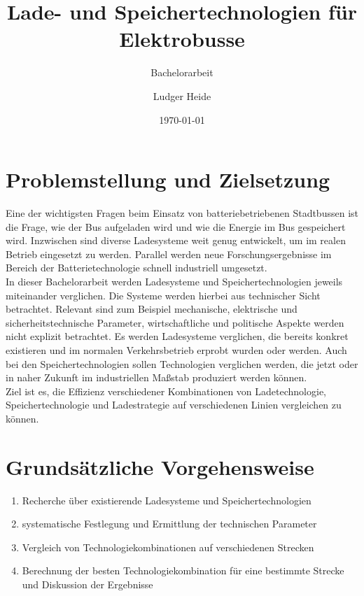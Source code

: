 \documentclass{scrartcl}
\title{Lade- und Speichertechnologien für Elektrobusse}
\subtitle{Bachelorarbeit}
\date{\today}
\author{Ludger Heide}
\begin{document}

\maketitle


\section*{Problemstellung und Zielsetzung}
Eine der wichtigsten Fragen beim Einsatz von batteriebetriebenen Stadtbussen ist die Frage, wie der Bus aufgeladen wird und wie die Energie im Bus gespeichert wird. Inzwischen sind diverse Ladesysteme weit genug entwickelt, um im realen Betrieb eingesetzt zu werden. Parallel werden neue Forschungsergebnisse im Bereich der Batterietechnologie schnell industriell umgesetzt.\\
In dieser Bachelorarbeit werden Ladesysteme und Speichertechnologien jeweils miteinander verglichen. Die Systeme werden hierbei aus technischer Sicht betrachtet. Relevant sind zum Beispiel mechanische, elektrische und sicherheitstechnische Parameter, wirtschaftliche und politische Aspekte werden nicht explizit betrachtet. Es werden Ladesysteme verglichen, die bereits konkret existieren und im normalen Verkehrsbetrieb erprobt wurden oder werden. Auch bei den Speichertechnologien sollen Technologien verglichen werden, die jetzt oder in naher Zukunft im industriellen Maßstab produziert werden können.\\
Ziel ist es, die Effizienz verschiedener Kombinationen von Ladetechnologie, Speichertechnologie und Ladestrategie auf verschiedenen Linien vergleichen zu können.

\section*{Grundsätzliche Vorgehensweise}
\begin{enumerate}
	\item Recherche über existierende Ladesysteme und Speichertechnologien
	\item systematische Festlegung und Ermittlung der technischen Parameter
	\item Vergleich von Technologiekombinationen auf verschiedenen Strecken
	\item Berechnung der besten Technologiekombination für eine bestimmte Strecke und Diskussion der Ergebnisse
\end{enumerate}


\end{document}

